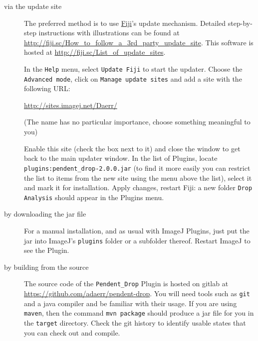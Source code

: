 \documentclass[fleqn]{scrartcl}
\newcommand{\gouttependante}{\texttt{Pendent\_Drop}\xspace}
\begin{document}
\begin{description}
\item[via the update site] The preferred method is to use
  \href{http://fiji.sc/}{Fiji}'s \cite{FijiSite,Schindelin2012} update
  mechanism. Detailed step-by-step instructions with illustrations can
  be found at
  \url{http://fiji.sc/How_to_follow_a_3rd_party_update_site}. This
  software is hosted at \url{http://fiji.sc/List_of_update_sites}.

  In the \texttt{Help} menu, select \texttt{Update Fiji} to start the
  updater. Choose the \texttt{Advanced mode}, click on \texttt{Manage
    update sites} and add a site with the following URL:
  \begin{center}
    \url{http://sites.imagej.net/Daerr/}
  \end{center}
  (The name has no particular importance, choose something meaningful
  to you)

  Enable this site (check the box next to it) and close the window to
  get back to the main updater window. In the list of Plugins, locate
  \texttt{plugins:pendent\_drop-2.0.0.jar} (to find it more easily you
  can restrict the list to items from the new site using the menu
  above the list), select it and mark it for installation. Apply
  changes, restart Fiji: a new folder \texttt{Drop Analysis} should
  appear in the Plugins menu.

\item[by downloading the jar file] For a manual installation, and as
  usual with ImageJ Plugins, just put the jar into ImageJ's
  \texttt{plugins} folder or a subfolder thereof. Restart ImageJ to
  see the Plugin.

\item[by building from the source] The source code of the
  \gouttependante Plugin is hosted on gitlab at
  \url{https://github.com/adaerr/pendent-drop}. You will need
  tools such as \texttt{git} and a java compiler and be familiar with
  their usage. If you are using \texttt{maven}, then the command
  \texttt{mvn package} should produce a jar file for you in the
  \texttt{target} directory. Check the git history to identify usable
  states that you can check out and compile.

\end{description}
\end{document}

